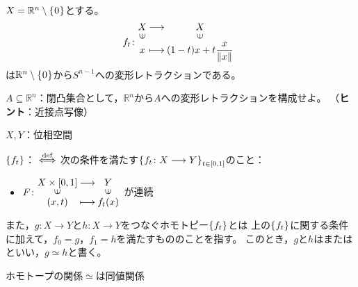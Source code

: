 \documentclass[uplatex]{jsarticle}
\begin{document}
\begin{rei}
  $X = \mathbb{R}^{n} \setminus \Set{\hspace{-1.8pt} 0 \hspace{-1.8pt}}$とする。
  \begin{equation}
    f_{t} \colon \mapdef{X}{X}{x}{(1-t)x+t\dfrac{x}{\left\| x \right\|}}
  \end{equation}
  は$\mathbb{R}^{n} \setminus \Set{\hspace{-1.8pt} 0 \hspace{-1.8pt}}$から$S^{n-1}$への変形レトラクションである。
\end{rei}

 $A \subseteq \mathbb{R}^{n}$：閉凸集合として，$\mathbb{R}^{n}$から$A$への変形レトラクションを構成せよ。
（{\bf ヒント}：近接点写像）

\sukima {}

$X,Y$：位相空間

\begin{teigi}[ホモトピー]
  $\Set{\hspace{-1.8pt} f_{t} \hspace{-1.8pt}}$： $\overset{\mathrm{def}}{\Longleftrightarrow}$ 次の条件を満たす$\Set{\hspace{-1.8pt} f_{t} \colon X \longrightarrow Y \hspace{-1.8pt}}_{t \in [0,1]}$のこと：
  \begin{itemize}
    \vspace{-0.5\baselineskip}
    \item $F \colon \mapdef{X \times [0,1]}{Y}{(x,t)}{f_{t}(x)}$が連続
  \end{itemize}

  また，$g \colon X \longrightarrow Y$と$h \colon X \longrightarrow Y$をつなぐホモトピー$\Set{\hspace{-1.8pt} f_{t} \hspace{-1.8pt}}$とは
  上の$\Set{\hspace{-1.8pt} f_{t} \hspace{-1.8pt}}$に関する条件に加えて，$f_{0} = g$，$f_{1} = h$を満たすもののことを指す。
  このとき，$g$と$h$はまたはといい，$g \simeq h$と書く。
\end{teigi}

\begin{hodai}
  ホモトープの関係$\simeq$は同値関係
\end{hodai}
\end{document}
